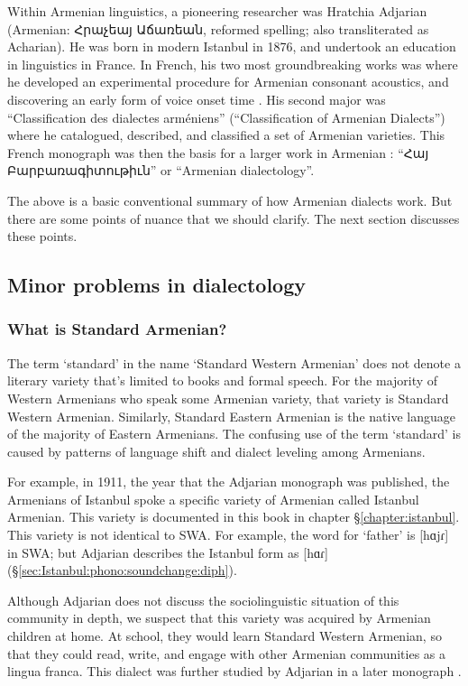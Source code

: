 Within Armenian linguistics, a pioneering researcher was Hratchia Adjarian (Armenian: Հրաչեայ Աճառեան, reformed spelling; also transliterated as Acharian). He was born in modern Istanbul in 1876, and undertook an education in linguistics in France. In French, his two most groundbreaking works was \citet{Adjarian-1899-ArmenianExplosives} where he developed an experimental procedure for Armenian consonant acoustics, and discovering an early form of voice onset time \citep{braun-2013-earlyCaseVOTAdjarian}. His second major was \citet{Adjarian-1909-ClassificationArmenianDialect} ``Classification des dialectes arméniens'' (``Classification of Armenian Dialects'') where he catalogued, described, and classified a set of Armenian varieties. This French monograph was then the basis for a larger work in Armenian   \citep{Adjarian-1911-DialectologyBook}: ``Հայ Բարբառագիտութիւն'' or ``Armenian dialectology''. 

The above is a basic conventional summary of how Armenian dialects work. But there are some points of nuance that we should clarify. The next section discusses these points. 

\subsection{Minor problems in dialectology}

\subsubsection{What is Standard Armenian?}
The term `standard' in the name `Standard Western Armenian' does not denote a literary variety that's limited to books and formal speech. For the majority of Western Armenians who speak some Armenian variety, that variety is Standard Western Armenian. Similarly, Standard Eastern Armenian is the native language of the majority of Eastern Armenians. The confusing use of the term `standard' is caused by patterns of language shift and dialect leveling among Armenians.

For example, in 1911, the year that the Adjarian monograph was published, the Armenians of Istanbul spoke a specific variety of Armenian called Istanbul Armenian. This variety is documented in this book in chapter \S\ref{chapter:istanbul}. This variety is not identical to SWA. For example, the word for `father' is [hɑjɾ] in SWA; but Adjarian describes the Istanbul form as [hɑɾ] (\S\ref{sec:Istanbul:phono:soundchange:diph}). 


Although Adjarian does not discuss the sociolinguistic situation of this community in depth, we suspect that this variety was acquired by Armenian children  at home. At school, they would learn Standard Western Armenian, so that they could read, write, and engage with other Armenian communities as a lingua franca. This dialect was further studied by Adjarian in a later monograph \citep{Adjarian-1941-IstanbulDialect}. 

